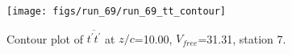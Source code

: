 \begin{figure}[H]
\centering
\texttt{[image: figs/run\_69/run\_69\_tt\_contour]}
\caption{Contour plot of $\overline{t^\prime t^\prime}$ at $z/c$=10.00, $V_{free}$=31.31, station 7.}
\end{figure}


